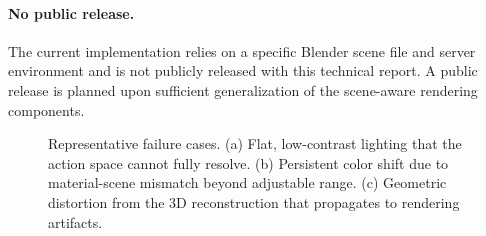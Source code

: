 \paragraph{No public release.}
The current implementation relies on a specific Blender scene file and server environment
and is not publicly released with this technical report.
A public release is planned upon sufficient generalization of the scene-aware rendering components.

\begin{figure}[t]
  \centering
  \caption{
    Representative failure cases.
    (a) Flat, low-contrast lighting that the action space cannot fully resolve.
    (b) Persistent color shift due to material-scene mismatch beyond adjustable range.
    (c) Geometric distortion from the 3D reconstruction that propagates to rendering artifacts.
  }
  \label{fig:failures}
\end{figure}
